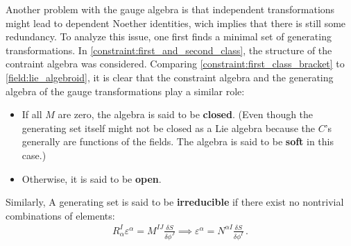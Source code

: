     Another problem with the gauge algebra is that independent transformations might lead to dependent Noether identities, wich implies that there is still some redundancy. To analyze this issue, one first finds a minimal set of generating transformations.
    In \cref{constraint:first_and_second_class}, the structure of the contraint algebra was considered. Comparing \cref{constraint:first_class_bracket} to \cref{field:lie_algebroid}, it is clear that the constraint algebra and the generating algebra of the gauge transformations play a similar role:
    \begin{itemize}
        \item If all $M$ are zero, the algebra is said to be \textbf{closed}. (Even though the generating set itself might not be closed as a Lie algebra because the $C$'s generally are functions of the fields. The algebra is said to be \textbf{soft} in this case.)
        \item Otherwise, it is said to be \textbf{open}.
    \end{itemize}
    Similarly, A generating set is said to be \textbf{irreducible} if there exist no nontrivial combinations of elements:
    \begin{gather}
        R^I_\alpha\varepsilon^\alpha = M^{IJ}\frac{\delta S}{\delta\phi^J}\implies\varepsilon^\alpha = N^{\alpha I}\frac{\delta S}{\delta\phi^I}\,.
    \end{gather}

